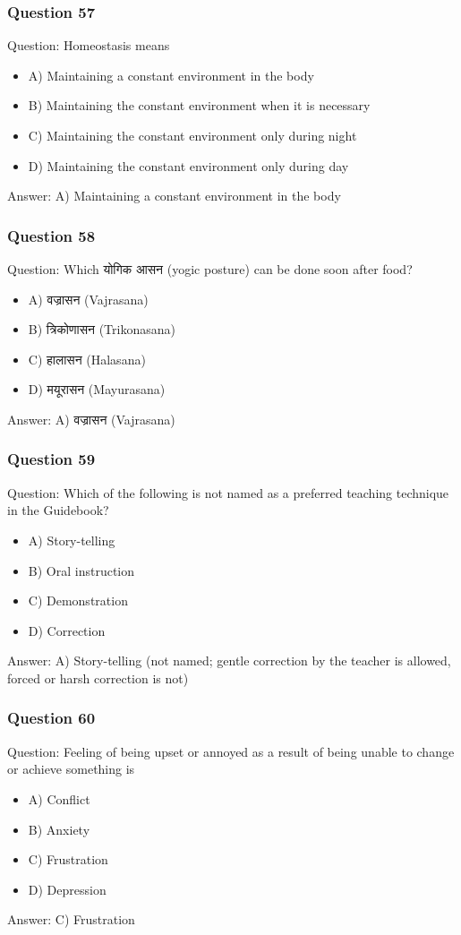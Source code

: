 \begin{frame}[fragile]\frametitle{Question 57}
Question: Homeostasis means
\begin{itemize}
\item A) Maintaining a constant environment in the body
\item B) Maintaining the constant environment when it is necessary
\item C) Maintaining the constant environment only during night
\item D) Maintaining the constant environment only during day
\end{itemize}
Answer: A) Maintaining a constant environment in the body
\end{frame}

\begin{frame}[fragile]\frametitle{Question 58}
Question: Which योगिक आसन (yogic posture) can be done soon after food?
\begin{itemize}
\item A) वज्रासन (Vajrasana)
\item B) त्रिकोणासन (Trikonasana)
\item C) हालासन (Halasana)
\item D) मयूरासन (Mayurasana)
\end{itemize}
Answer: A) वज्रासन (Vajrasana)
\end{frame}

\begin{frame}[fragile]\frametitle{Question 59}
Question: Which of the following is not named as a preferred teaching technique in the Guidebook?
\begin{itemize}
\item A) Story-telling
\item B) Oral instruction
\item C) Demonstration
\item D) Correction
\end{itemize}
Answer: A) Story-telling (not named; gentle correction by the teacher is allowed, forced or harsh correction is not)
\end{frame}

\begin{frame}[fragile]\frametitle{Question 60}
Question: Feeling of being upset or annoyed as a result of being unable to change or achieve something is
\begin{itemize}
\item A) Conflict
\item B) Anxiety
\item C) Frustration
\item D) Depression
\end{itemize}
Answer: C) Frustration
\end{frame}

